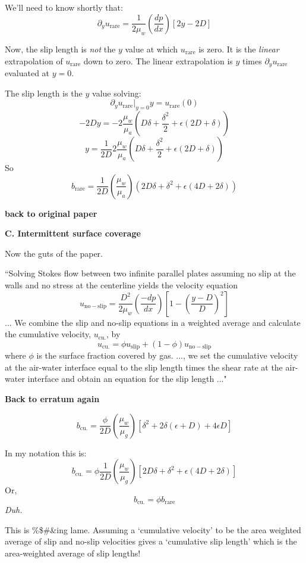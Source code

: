 \documentclass{article}
\begin{document}
We'll need to know shortly that:
\[ \partial_{y} u_{\mathrm{rare}} = \frac{1}{2\mu_{w}} \left( \frac{dp}{dx} \right)
 \left[
2y - 2D
\right] \]


Now, the slip length is \emph{not} the $y$ value at which $u_{\mathrm{rare}}$ is zero.
It is the \emph{linear} extrapolation of $u_{\mathrm{rare}}$ down to zero.  The linear extrapolation is $y$ times $\partial_{y} u_{\mathrm{rare}}$ evaluated at $y=0$.

The slip length is the $y$ value solving:
\[  \partial_{y} u_{\mathrm{rare}}|_{y=0} y = u_{\mathrm{rare}}(0) \]
\[  - 2D y = - 2 \frac{\mu_{w}}{\mu_{a}} 
\left( D \delta + \frac{\delta^{2}}{2} + \epsilon ( 2D + \delta)  \right) \]
\[ y = \frac{1}{2D} 2 \frac{\mu_{w}}{\mu_{a}} 
\left( D \delta + \frac{\delta^{2}}{2} + \epsilon ( 2D + \delta)  \right)  \]
So
\[ b_{\mathrm{rare}} = \frac{1}{2D} \left( \frac{\mu_{w}}{\mu_{a}} \right)
\left( 2 D \delta + \delta^{2} + \epsilon ( 4D + 2\delta)  \right) \]

\textbf{back to original paper}

\textbf{C. Intermittent surface coverage}

Now the guts of the paper.

``Solving Stokes flow between two infinite parallel plates assuming no slip at the walls and no stress at the centerline yields the velocity equation
\[ u_{\mathrm{no-slip}} = \frac{D^{2}}{2 \mu_{w}} \left( \frac{-dp}{dx} \right)
\left[ 1 - \left( \frac{y - D}{D}  \right)^{2} \right] \]
... We combine the slip and no-slip equations in a weighted average and calculate the cumulative velocity, $u_{\mathrm{cu.}}$, by
\[ u_{\mathrm{cu.}} = \phi u_{\mathrm{slip}} + (1-\phi) u_{\mathrm{no-slip}} \]
where $\phi$ is the surface fraction covered by gas. ..., we set the cumulative velocity at the air-water interface equal to the slip length times the shear rate at the air-water interface and obtain an equation for the slip length ..."

\textbf{Back to erratum again}

\[b_{\mathrm{cu.}} = \frac{\phi}{2D} \left( \frac{\mu_{w}}{\mu_{g}} \right)
\left[ \delta^{2} + 2 \delta (\epsilon + D) + 4 \epsilon D \right]  \]

In my notation this is:
\[ b_{\mathrm{cu.}} = \phi \frac{1}{2D} \left( \frac{\mu_{w}}{\mu_{g}} \right)
\left[ 2 D \delta + \delta^{2} + \epsilon ( 4D + 2 \delta ) \right] \]
Or, 
\[ b_{\mathrm{cu.}} = \phi b_{\mathrm{rare}} \]
\emph{Duh.}

This is \%\$\#\&ing lame.  Assuming a `cumulative velocity' to be the area weighted average of slip and no-slip velocities gives a `cumulative slip length' which is the area-weighted average of slip lengths!
\end{document}
